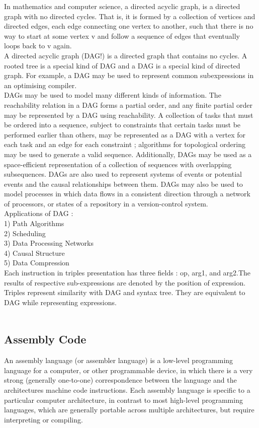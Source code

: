 \documentclass[12pt]{article}
\begin{document}
In mathematics and computer science, a directed acyclic graph, is a directed
graph with no directed cycles. That is, it is formed by a collection of vertices and
directed edges, each edge connecting one vertex to another, such that there is no
way to start at some vertex v and follow a sequence of edges that eventually loops
back to v again.\\

A directed acyclic graph (DAG!) is a directed graph that contains no cycles.
A rooted tree is a special kind of DAG and a DAG is a special kind of directed
graph. For example, a DAG may be used to represent common subexpressions in
an optimising compiler.\\

DAGs may be used to model many different kinds of information. The reachability
relation in a DAG forms a partial order, and any finite partial order may
be represented by a DAG using reachability. A collection of tasks that must be
ordered into a sequence, subject to constraints that certain tasks must be performed
earlier than others, may be represented as a DAG with a vertex for each task
and an edge for each constraint ; algorithms for topological ordering may be used
to generate a valid sequence. Additionally, DAGs may be used as a space-efficient
representation of a collection of sequences with overlapping subsequences. DAGs
are also used to represent systems of events or potential events and the causal
relationships between them. DAGs may also be used to model processes in which
data flows in a consistent direction through a network of processors, or states of a
repository in a version-control system.\\
Applications of DAG :\\
1) Path Algorithms\\
2) Scheduling\\
3) Data Processing Networks\\
4) Causal Structure\\
5) Data Compression\\
Each instruction in triples presentation has three fields : op, arg1, and arg2.The
results of respective sub-expressions are denoted by the position of expression.
Triples represent similarity with DAG and syntax tree. They are equivalent to
DAG while representing expressions.\\\\

\subsection{Assembly Code}
An assembly language (or assembler language) is a low-level programming language
for a computer, or other programmable device, in which there is a very strong
(generally one-to-one) correspondence between the language and the architectures
machine code instructions. Each assembly language is specific to a particular computer
architecture, in contrast to most high-level programming languages, which
are generally portable across multiple architectures, but require interpreting or
compiling.\\
\end{document}
